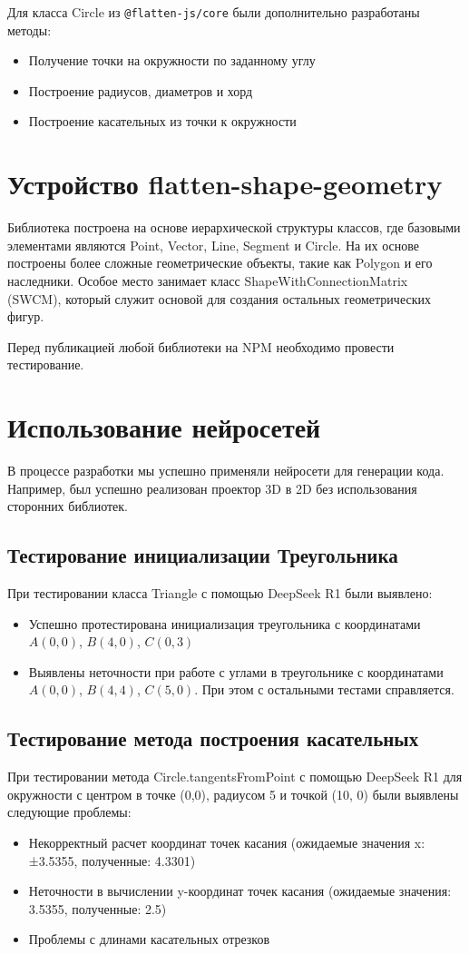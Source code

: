 \documentclass[a4paper, 12pt]{extarticle}
\begin{document}
Для класса Circle из \texttt{@flatten-js/core} были дополнительно разработаны методы:
\begin{itemize}
    \item Получение точки на окружности по заданному углу
    \item Построение радиусов, диаметров и хорд
    \item Построение касательных из точки к окружности
\end{itemize}

\section{Устройство flatten-shape-geometry}

Библиотека построена на основе иерархической структуры классов, где базовыми элементами являются Point, Vector, Line, Segment и Circle. На их основе построены более сложные геометрические объекты, такие как Polygon и его наследники. Особое место занимает класс ShapeWithConnectionMatrix (SWCM), который служит основой для создания остальных геометрических фигур.

Перед публикацией любой библиотеки на NPM необходимо провести тестирование. 

\section{Использование нейросетей}

В процессе разработки мы успешно применяли нейросети для генерации кода. Например, был успешно реализован проектор 3D в 2D без использования сторонних библиотек. 
\subsection*{Тестирование инициализации Треугольника}
При тестировании класса Triangle с помощью DeepSeek R1 были выявлено:
\begin{itemize}
    \item Успешно протестирована инициализация треугольника с координатами $A(0,0)$, $B(4,0)$, $C(0,3)$
    \item Выявлены неточности при работе с углами в треугольнике с координатами $A(0,0)$, $B(4,4)$, $C(5,0)$. При этом с остальными тестами справляется.
\end{itemize}

\subsection*{Тестирование метода построения касательных}
При тестировании метода Circle.tangentsFromPoint с помощью DeepSeek R1 для окружности с центром в точке (0,0), радиусом 5 и точкой (10, 0) были выявлены следующие проблемы:
\begin{itemize}
    \item Некорректный расчет координат точек касания (ожидаемые значения x: ±3.5355, полученные: 4.3301)
    \item Неточности в вычислении y-координат точек касания (ожидаемые значения: 3.5355, полученные: 2.5)
    \item Проблемы с длинами касательных отрезков
\end{itemize}
\end{document}
